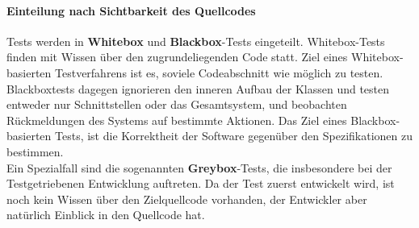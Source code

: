 \paragraph{Einteilung nach Sichtbarkeit des Quellcodes} Tests werden in \textbf{Whitebox} und \textbf{Blackbox}-Tests eingeteilt.
Whitebox-Tests finden mit Wissen über den zugrundeliegenden Code statt. Ziel eines Whitebox-basierten Testverfahrens ist es, soviele Codeabschnitt wie möglich zu testen.\\
Blackboxtests dagegen ignorieren den inneren Aufbau der Klassen und testen entweder nur Schnittstellen oder das Gesamtsystem, und beobachten Rückmeldungen des Systems auf bestimmte Aktionen. Das Ziel eines Blackbox-basierten Tests, ist die Korrektheit der Software gegenüber den Spezifikationen zu bestimmen.\\
Ein Spezialfall sind die sogenannten \textbf{Greybox}-Tests, die insbesondere bei der Testgetriebenen Entwicklung auftreten. Da der Test zuerst entwickelt wird, ist noch kein Wissen über den Zielquellcode vorhanden, der Entwickler aber natürlich Einblick in den Quellcode hat.

